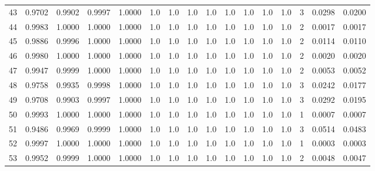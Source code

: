 \begin{tabular}{lrrrrrrrrrrrrrrr}
43  &      0.9702 &  0.9902 &  0.9997 &  1.0000 &     1.0 &     1.0 &     1.0 &     1.0 &     1.0 &     1.0 &      1.0 &        1.0 &      3 &                    0.0298 &                     0.0200 \\
44  &      0.9983 &  1.0000 &  1.0000 &  1.0000 &     1.0 &     1.0 &     1.0 &     1.0 &     1.0 &     1.0 &      1.0 &        1.0 &      2 &                    0.0017 &                     0.0017 \\
45  &      0.9886 &  0.9996 &  1.0000 &  1.0000 &     1.0 &     1.0 &     1.0 &     1.0 &     1.0 &     1.0 &      1.0 &        1.0 &      2 &                    0.0114 &                     0.0110 \\
46  &      0.9980 &  1.0000 &  1.0000 &  1.0000 &     1.0 &     1.0 &     1.0 &     1.0 &     1.0 &     1.0 &      1.0 &        1.0 &      2 &                    0.0020 &                     0.0020 \\
47  &      0.9947 &  0.9999 &  1.0000 &  1.0000 &     1.0 &     1.0 &     1.0 &     1.0 &     1.0 &     1.0 &      1.0 &        1.0 &      2 &                    0.0053 &                     0.0052 \\
48  &      0.9758 &  0.9935 &  0.9998 &  1.0000 &     1.0 &     1.0 &     1.0 &     1.0 &     1.0 &     1.0 &      1.0 &        1.0 &      3 &                    0.0242 &                     0.0177 \\
49  &      0.9708 &  0.9903 &  0.9997 &  1.0000 &     1.0 &     1.0 &     1.0 &     1.0 &     1.0 &     1.0 &      1.0 &        1.0 &      3 &                    0.0292 &                     0.0195 \\
50  &      0.9993 &  1.0000 &  1.0000 &  1.0000 &     1.0 &     1.0 &     1.0 &     1.0 &     1.0 &     1.0 &      1.0 &        1.0 &      1 &                    0.0007 &                     0.0007 \\
51  &      0.9486 &  0.9969 &  0.9999 &  1.0000 &     1.0 &     1.0 &     1.0 &     1.0 &     1.0 &     1.0 &      1.0 &        1.0 &      3 &                    0.0514 &                     0.0483 \\
52  &      0.9997 &  1.0000 &  1.0000 &  1.0000 &     1.0 &     1.0 &     1.0 &     1.0 &     1.0 &     1.0 &      1.0 &        1.0 &      1 &                    0.0003 &                     0.0003 \\
53  &      0.9952 &  0.9999 &  1.0000 &  1.0000 &     1.0 &     1.0 &     1.0 &     1.0 &     1.0 &     1.0 &      1.0 &        1.0 &      2 &                    0.0048 &                     0.0047 \\

\end{tabular}
